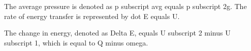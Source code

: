 The average pressure is denoted as p subscript avg equals p subscript 2g. The rate of energy transfer is represented by dot E equals U.

The change in energy, denoted as Delta E, equals U subscript 2 minus U subscript 1, which is equal to Q minus omega.